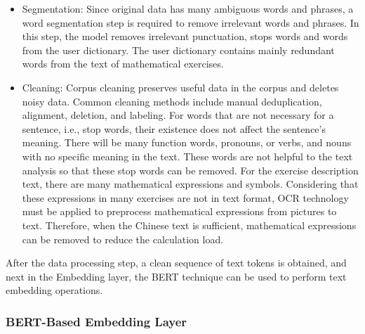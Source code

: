 \begin{itemize}
    \item Segmentation: Since original data has many ambiguous words and phrases, a word segmentation step is required to remove irrelevant words and phrases. In this step, the model removes irrelevant punctuation, stops words and words from the user dictionary. The user dictionary contains mainly redundant words from the text of mathematical exercises.
    \item Cleaning: Corpus cleaning preserves useful data in the corpus and deletes noisy data. Common cleaning methods include manual deduplication, alignment, deletion, and labeling. For words that are not necessary for a sentence, i.e., stop words, their existence does not affect the sentence's meaning. There will be many function words, pronouns, or verbs, and nouns with no specific meaning in the text. These words are not helpful to the text analysis so that these stop words can be removed. For the exercise description text, there are many mathematical expressions and symbols. Considering that these expressions in many exercises are not in text format, OCR technology must be applied to preprocess mathematical expressions from pictures to text. Therefore, when the Chinese text is sufficient, mathematical expressions can be removed to reduce the calculation load.
\end{itemize}

After the data processing step, a clean sequence of text tokens is obtained, and next in the Embedding layer, the BERT technique can be used to perform text embedding operations.

\subsubsection{BERT-Based Embedding Layer}

